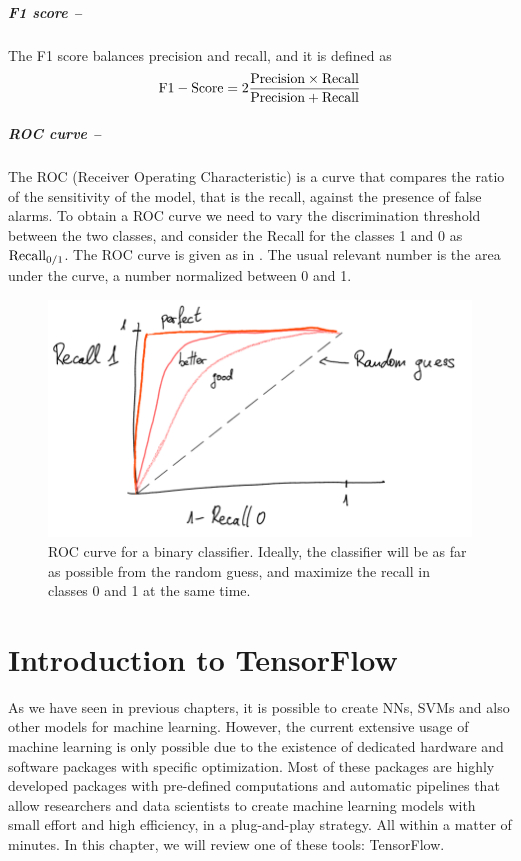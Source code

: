 \documentclass[]{report}
\begin{document}
\paragraph{F1 score --} The F1 score balances precision and recall, and it is defined as
\begin{equation}
{\rm F1-Score} = 2 \frac{{\rm Precision} \times {\rm Recall}}{{\rm Precision} + {\rm Recall}}
\end{equation}

\paragraph{ROC curve --}
The ROC (Receiver Operating Characteristic) is a curve that compares the ratio of the sensitivity of the model, that is the recall, against the presence of false alarms. To obtain a ROC curve we need to vary the discrimination threshold between the two classes, and consider the Recall for the classes 1 and 0 as ${\rm Recall_{0 / 1}}$. The ROC curve is given as in . The usual relevant number is the area under the curve, a number normalized between 0 and 1. 

\begin{figure}
\centering
\includegraphics[width = .8\linewidth]{images/ROC}
\caption{ROC curve for a binary classifier. Ideally, the classifier will be as far as possible from the random guess, and maximize the recall in classes 0 and 1 at the same time. }
\label{fig.roc}
\end{figure}


\chapter{Introduction to TensorFlow}\label{sec.tensorflow}

As we have seen in previous chapters, it is possible to create NNs, SVMs and also other models for machine learning. However, the current extensive usage of machine learning is only possible due to the existence of dedicated hardware and software packages with specific optimization. Most of these packages are highly developed packages with pre-defined computations and automatic pipelines that allow researchers and data scientists to create machine learning models with small effort and high efficiency, in a plug-and-play strategy. All within a matter of minutes. In this chapter, we will review one of these tools: TensorFlow. 
\end{document}
